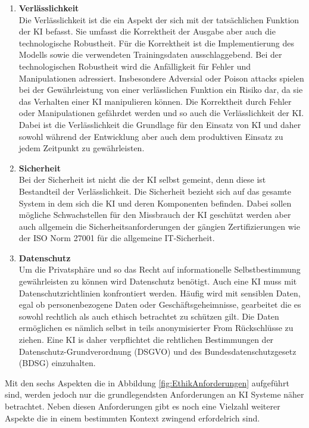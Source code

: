 \begin{onehalfspace}
\begin{enumerate}
            \item \textbf{Verlässlichkeit} \\
            Die Verlässlichkeit ist die ein Aspekt der sich mit der tatsächlichen Funktion der \ac*{KI} befasst. Sie umfasst die Korrektheit der Ausgabe aber auch die technologische Robustheit. Für die Korrektheit ist die Implementierung des Modells sowie die verwendeten Trainingsdaten ausschlaggebend. Bei der technologischen Robustheit wird die Anfälligkeit für Fehler und Manipulationen adressiert. Insbesondere Adversial oder Poison attacks spielen bei der Gewährleistung von einer verlässlichen Funktion ein Risiko dar, da sie das Verhalten einer \ac*{KI} manipulieren können. Die Korrektheit durch Fehler oder Manipulationen gefährdet werden und so auch die Verlässlichkeit der \ac{KI}. Dabei ist die Verlässlichkeit die Grundlage für den Einsatz von \ac*{KI} und daher sowohl während der Entwicklung aber auch dem produktiven Einsatz zu jedem Zeitpunkt zu gewährleisten.\cite{Cremers2019}\cite{Hallensleben2020}
            \item \textbf{Sicherheit} \\
            Bei der Sicherheit ist nicht die der \ac*{KI} selbst gemeint, denn diese ist Bestandteil der Verlässlichkeit. Die Sicherheit bezieht sich auf das gesamte System in dem sich die \ac*{KI} und deren Komponenten befinden. Dabei sollen mögliche Schwachstellen für den Missbrauch der \ac*{KI} geschützt werden aber auch allgemein die Sicherheitsanforderungen der gängien Zertifizierungen wie der ISO Norm 27001 für die allgemeine IT-Sicherheit.\cite{Cremers2019}\cite{Hagendorff2020}
            \item \textbf{Datenschutz} \\
            Um die Privatsphäre und so das Recht auf informationelle Selbstbestimmung gewährleisten zu können wird Datenschutz benötigt. Auch eine \ac*{KI} muss mit Datenschutzrichtlinien konfrontiert werden. Häufig wird mit sensiblen Daten, egal ob personenbezogene Daten oder Geschäftsgeheimnisse, gearbeitet die es sowohl rechtlich als auch ethisch betrachtet zu schützen gilt. Die Daten ermöglichen es nämlich selbst in teils anonymisierter From Rückschlüsse zu ziehen. Eine \ac*{KI} is daher verpflichtet die rehtlichen Bestimmungen der Datenschutz-Grundverordnung (DSGVO) und des Bundesdatenschutzgesetz (BDSG) einzuhalten.\cite{Cremers2019}
        \end{enumerate}
        Mit den sechs Aspekten die in Abbildung \ref*{fig:EthikAnforderungen} aufgeführt sind, werden jedoch nur die grundlegendsten Anforderungen an \ac*{KI} Systeme näher betrachtet. Neben diesen Anforderungen gibt es noch eine Vielzahl weiterer Aspekte die in einem bestimmten Kontext zwingend erfordelrich sind. 

\end{onehalfspace}
